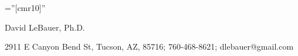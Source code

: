 \documentclass[a4paper,10pt]{article}
\begin{document}

\pagestyle{empty} %

\font\fb=''[cmr10]'' %

\par{\centering
		{\Large David LeBauer, Ph.D.
	}\bigskip\par} 

\vspace{-1.5em}
\begin{center}
    2911 E Canyon Bend St, Tucson, AZ, 85716; 760-468-8621; dlebauer@gmail.com%
\end{center}
\vspace{1em}
\end{document}
